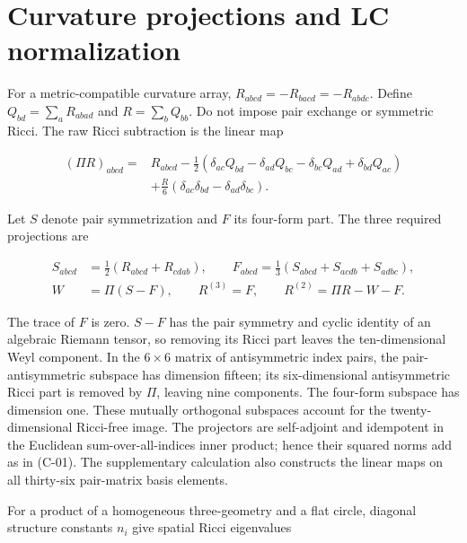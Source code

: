 \section{Curvature projections and LC normalization}

For a metric-compatible curvature array, $R_{abcd}=-R_{bacd}=-R_{abdc}$. Define $Q_{bd}=\sum_aR_{abad}$ and $R=\sum_bQ_{bb}$. Do not impose pair exchange or symmetric Ricci. The raw Ricci subtraction is the linear map

\begin{equation}\tag{A-01}\label{eq:A-01}
\begin{aligned}
(\Pi R)_{abcd}={}&R_{abcd}
-\frac12(\delta_{ac}Q_{bd}-\delta_{ad}Q_{bc}
-\delta_{bc}Q_{ad}+\delta_{bd}Q_{ac})\\
&+\frac{R}{6}(\delta_{ac}\delta_{bd}-\delta_{ad}\delta_{bc}).
\end{aligned}
\end{equation}

Let $S$ denote pair symmetrization and $F$ its four-form part. The three required projections are

\begin{equation}\tag{A-02}\label{eq:A-02}
\begin{aligned}
S_{abcd}&=\tfrac12(R_{abcd}+R_{cdab}),\qquad
F_{abcd}=\tfrac13(S_{abcd}+S_{acdb}+S_{adbc}),\\
W&=\Pi(S-F),\qquad R^{(3)}=F,\qquad
R^{(2)}=\Pi R-W-F.
\end{aligned}
\end{equation}

The trace of $F$ is zero. $S-F$ has the pair symmetry and cyclic identity of an algebraic Riemann tensor, so removing its Ricci part leaves the ten-dimensional Weyl component. In the $6\times6$ matrix of antisymmetric index pairs, the pair-antisymmetric subspace has dimension fifteen; its six-dimensional antisymmetric Ricci part is removed by $\Pi$, leaving nine components. The four-form subspace has dimension one. These mutually orthogonal subspaces account for the twenty-dimensional Ricci-free image. The projectors are self-adjoint and idempotent in the Euclidean sum-over-all-indices inner product; hence their squared norms add as in (C-01). The supplementary calculation also constructs the linear maps on all thirty-six pair-matrix basis elements.

For a product of a homogeneous three-geometry and a flat circle, diagonal structure constants $n_i$ give spatial Ricci eigenvalues

